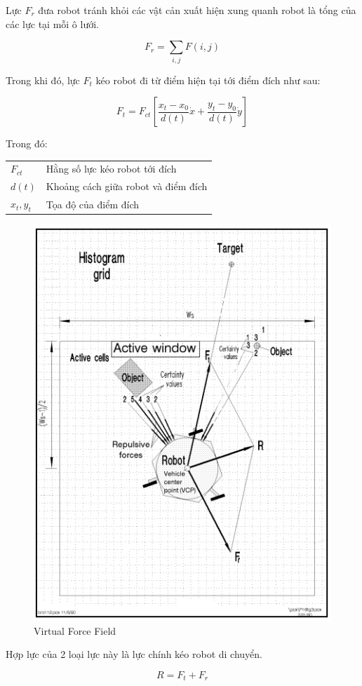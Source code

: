 Lực ${F}_{r}$ đưa robot tránh khỏi các vật cản xuất hiện xung quanh robot là tổng của các lực tại mỗi ô lưới. 

\begin{equation}
  {F}_{r} = \sum\limits_{i,j}{F(i,j)}
\end{equation}

Trong khi đó, lực ${F}_{t}$ kéo robot đi từ điểm hiện tại tới điểm đích như sau: 

\begin{equation}
  {F}_{t} = {F}_{ct} \left [\frac{{x}_{t}-{x}_{0}}{d(t)}\dot{x} + \frac{{y}_{t}-{y}_{0}}{d(t)}\dot{y} 
  \right ]
\end{equation}

Trong đó: 

\begin{tabular} {ll}
  ${F}_{ct}$    & Hằng số lực kéo robot tới đích \\
  $d(t)$        & Khoảng cách giữa robot và điểm đích \\
  ${x}_{t}, {y}_{t}$ & Tọa độ của điểm đích
\end{tabular}

\begin{figure}[htp]
  \centering
  \includegraphics[width=0.5\linewidth]{figures/VFFconcept.png}
  \caption{Virtual Force Field \cite{Koren1991}}
  \label{fig:VFFconcept}
\end{figure}

Hợp lực của 2 loại lực này là lực chính kéo robot di chuyển.

\begin{equation}
  R = {F}_{t} + {F}_{r}
\end{equation}


